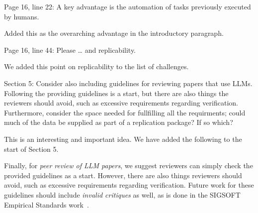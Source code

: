 \documentclass[12pt,english]{reviewresponse}
\begin{document}
\begin{revcomment}
Page 16, line 22: A key advantage is the automation of tasks previously executed by humans.
\end{revcomment}
\begin{revresponse}
    Added this as the overarching advantage in the introductory paragraph.
\end{revresponse}

\begin{revcomment}
Page 16, line 44: Please … and replicability.
\end{revcomment}
\begin{revresponse}
    We added this point on replicability to the list of challenges.
\end{revresponse}

\begin{revcomment}
Section 5: Consider also including guidelines for reviewing papers that use LLMs. Following the providing guidelines is a start, but there are also things the reviewers should avoid, such as excessive requirements regarding verification. Furthermore, consider the space needed for fullfilling all the requirments; could much of the data be supplied as part of a replication package? If so which?
\end{revcomment}
\begin{revresponse}
    This is an interesting and important idea. We have added the following to the start of Section 5.
    \begin{changes}
        Finally, for \emph{peer review of LLM papers}, we suggest reviewers can simply check the provided guidelines as a start. However, there are also things reviewers should avoid, such as excessive requirements regarding verification. Future work for these guidelines should include \emph{invalid critiques} as well, as is done in the SIGSOFT Empirical Standards work~\cite{ralph2021empiricalstandardssoftwareengineering}.
        \end{changes}
\end{revresponse}
\end{document}
